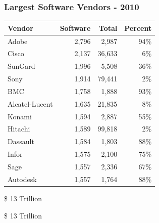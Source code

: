\documentclass[18pt]{beamer}
\begin{document}
\begin{frame}
\frametitle{Largest Software Vendors - 2010}

\begin{center}
\begin{tabular}{lrrr}
\hline
\textbf{Vendor} &	\textbf{Software} & \textbf{Total} & \textbf{Percent} \\
\hline
\hline
 Adobe & 2,796 &  2,987 & 94\% \\
 Cisco & 2,137 & 36,633 & 6\% \\
 SunGard & 1,996  & 5,508 & 36\% \\
 Sony & 1,914 &  79,441 & 2\% \\
 BMC & 1,758& 1,888 & 93\% \\
 Alcatel-Lucent & 1,635  &  21,835 & 8\% \\
 Konami & 1,594 &  2,887 & 55\% \\
 Hitachi & 1,589 & 99,818 & 2\% \\
 Dassault & 1,584 & 1,803 & 88\% \\
 Infor & 1,575 & 2,100 & 75\% \\
 Sage & 1,557 & 2,336 & 67\% \\
 Autodesk & 1,557 & 1,764 & 88\% \\
\end{tabular}
\end{center}
\end{frame}


{
\begin{frame}[plain]
\fontsize{72pt}{90pt}\selectfont
\center
\begin{center}
\$ 13 Trillion
\end{center}
\end{frame}
}

{
\begin{frame}[plain]
\fontsize{72pt}{90pt}\selectfont
\center
\begin{center}
\$ 13 Trillion
\end{center}
\end{frame}
}
\end{document}
